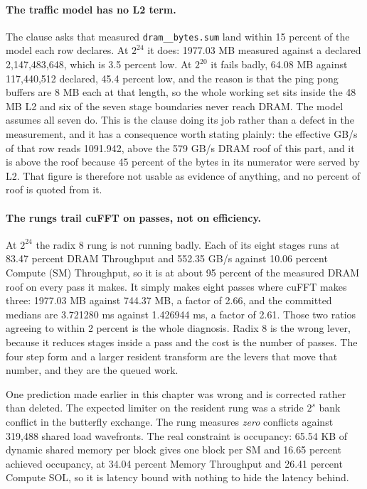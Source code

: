 \paragraph{The traffic model has no L2 term.} The clause asks that measured
\texttt{dram\_\_bytes.sum} land within 15 percent of the model each row declares.
At $2^{24}$ it does: 1977.03 MB measured against a declared 2,147,483,648, which is
3.5 percent low. At $2^{20}$ it fails badly, 64.08 MB against 117,440,512 declared,
45.4 percent low, and the reason is that the ping pong buffers are 8 MB each at
that length, so the whole working set sits inside the 48 MB L2 and six of the seven
stage boundaries never reach DRAM. The model assumes all seven do. This is the
clause doing its job rather than a defect in the measurement, and it has a
consequence worth stating plainly: the effective GB/s of that row reads 1091.942,
above the 579 GB/s DRAM roof of this part, and it is above the roof because 45
percent of the bytes in its numerator were served by L2. That figure is therefore
not usable as evidence of anything, and no percent of roof is quoted from it.

\paragraph{The rungs trail cuFFT on passes, not on efficiency.} At $2^{24}$ the
radix 8 rung is not running badly. Each of its eight stages runs at 83.47 percent
DRAM Throughput and 552.35 GB/s against 10.06 percent Compute (SM) Throughput, so
it is at about 95 percent of the measured DRAM roof on every pass it makes. It
simply makes eight passes where cuFFT makes three: 1977.03 MB against 744.37 MB, a
factor of 2.66, and the committed medians are 3.721280 ms against 1.426944 ms, a
factor of 2.61. Those two ratios agreeing to within 2 percent is the whole
diagnosis. Radix 8 is the wrong lever, because it reduces stages inside a pass and
the cost is the number of passes. The four step form and a larger resident
transform are the levers that move that number, and they are the queued work.

One prediction made earlier in this chapter was wrong and is corrected rather than
deleted. The expected limiter on the resident rung was a stride $2^s$ bank conflict
in the butterfly exchange. The rung measures \emph{zero} conflicts against 319,488
shared load wavefronts. The real constraint is occupancy: 65.54 KB of dynamic
shared memory per block gives one block per SM and 16.65 percent achieved
occupancy, at 34.04 percent Memory Throughput and 26.41 percent Compute SOL, so it
is latency bound with nothing to hide the latency behind.
